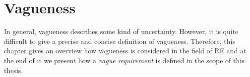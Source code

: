\section{Vagueness}
\label{chp:fundamentals:sec:vagueness}
In general, vagueness describes some kind of uncertainty.
However, it is quite difficult to give a precise and concise definition of vagueness.
Therefore, this chapter gives an overview how vagueness is considered in the field of \ac{RE} and at the end of it we present how a \textit{vague requirement} is defined in the scope of this thesis.





